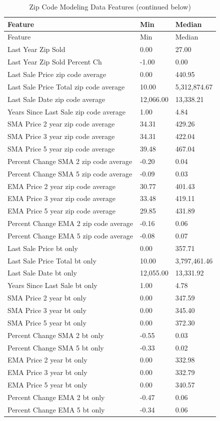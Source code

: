 \documentclass[]{article}
\begin{document}
\begin{longtable}[]{@{}lll@{}}
\caption{Zip Code Modeling Data Features (continued
below)}\tabularnewline
\toprule
Feature & Min & Median\tabularnewline
\midrule
\endfirsthead
\toprule
Feature & Min & Median\tabularnewline
\midrule
\endhead
Last Year Zip Sold & 0.00 & 27.00\tabularnewline
Last Year Zip Sold Percent Ch & -1.00 & 0.00\tabularnewline
Last Sale Price zip code average & 0.00 & 440.95\tabularnewline
Last Sale Price Total zip code average & 10.00 &
5,312,874.67\tabularnewline
Last Sale Date zip code average & 12,066.00 & 13,338.21\tabularnewline
Years Since Last Sale zip code average & 1.00 & 4.84\tabularnewline
SMA Price 2 year zip code average & 34.31 & 429.26\tabularnewline
SMA Price 3 year zip code average & 34.31 & 422.04\tabularnewline
SMA Price 5 year zip code average & 39.48 & 467.04\tabularnewline
Percent Change SMA 2 zip code average & -0.20 & 0.04\tabularnewline
Percent Change SMA 5 zip code average & -0.09 & 0.03\tabularnewline
EMA Price 2 year zip code average & 30.77 & 401.43\tabularnewline
EMA Price 3 year zip code average & 33.48 & 419.11\tabularnewline
EMA Price 5 year zip code average & 29.85 & 431.89\tabularnewline
Percent Change EMA 2 zip code average & -0.16 & 0.06\tabularnewline
Percent Change EMA 5 zip code average & -0.08 & 0.07\tabularnewline
Last Sale Price bt only & 0.00 & 357.71\tabularnewline
Last Sale Price Total bt only & 10.00 & 3,797,461.46\tabularnewline
Last Sale Date bt only & 12,055.00 & 13,331.92\tabularnewline
Years Since Last Sale bt only & 1.00 & 4.78\tabularnewline
SMA Price 2 year bt only & 0.00 & 347.59\tabularnewline
SMA Price 3 year bt only & 0.00 & 345.40\tabularnewline
SMA Price 5 year bt only & 0.00 & 372.30\tabularnewline
Percent Change SMA 2 bt only & -0.55 & 0.03\tabularnewline
Percent Change SMA 5 bt only & -0.33 & 0.02\tabularnewline
EMA Price 2 year bt only & 0.00 & 332.98\tabularnewline
EMA Price 3 year bt only & 0.00 & 332.79\tabularnewline
EMA Price 5 year bt only & 0.00 & 340.57\tabularnewline
Percent Change EMA 2 bt only & -0.47 & 0.06\tabularnewline
Percent Change EMA 5 bt only & -0.34 & 0.06\tabularnewline
\bottomrule
\end{longtable}
\end{document}
